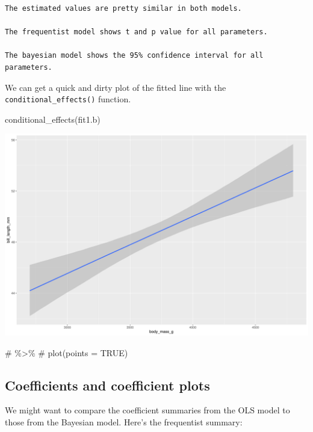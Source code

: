 \documentclass[
  letterpaper,
  DIV=11,
  numbers=noendperiod]{scrartcl}
\newenvironment{Shaded}{\begin{snugshade}}{\end{snugshade}}
\newcommand{\CommentTok}[1]{\textcolor[rgb]{0.37,0.37,0.37}{#1}}
\newcommand{\FunctionTok}[1]{\textcolor[rgb]{0.28,0.35,0.67}{#1}}
\newcommand{\NormalTok}[1]{\textcolor[rgb]{0.00,0.23,0.31}{#1}}
\begin{document}
\begin{verbatim}
The estimated values are pretty similar in both models. 

The frequentist model shows t and p value for all parameters.

The bayesian model shows the 95% confidence interval for all parameters.
\end{verbatim}

We can get a quick and dirty plot of the fitted line with the
\texttt{conditional\_effects()} function.

\begin{Shaded}
\begin{Highlighting}[]
\FunctionTok{conditional\_effects}\NormalTok{(fit1.b)}
\end{Highlighting}
\end{Shaded}

\includegraphics{Bayes_Lab_1_files/figure-pdf/unnamed-chunk-21-1.pdf}

\begin{Shaded}
\begin{Highlighting}[]
\CommentTok{\# \%\textgreater{}\% }
\CommentTok{\#   plot(points = TRUE)}
\end{Highlighting}
\end{Shaded}

\subsection{Coefficients and coefficient
plots}\label{coefficients-and-coefficient-plots}

We might want to compare the coefficient summaries from the OLS model to
those from the Bayesian model. Here's the frequentist summary:
\end{document}
